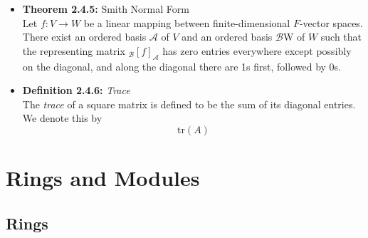 \documentclass[11pt,a4paper]{article}
\begin{document}
\begin{itemize}
    \item \textbf{Theorem 2.4.5:} Smith Normal Form \\
        Let $f : V \to W$ be a linear mapping between finite-dimensional $F$-vector spaces.
        There exist an ordered basis $\mathcal{A}$ of $V$ and an ordered basis
        $\mathcal{B}$W of $W$
        such that the representing matrix $_\mathcal{B}{[f]}_\mathcal{A}$
        has zero entries everywhere except possibly on the diagonal,
        and along the diagonal there are 1s first, followed by 0s.

    \item \textbf{Definition 2.4.6:} \emph{Trace} \\
        The \emph{trace} of a square matrix is defined to be the sum of its diagonal entries.
        We denote this by
        \[
            \mathrm{tr}(A)
        \]
\end{itemize}

\section{Rings and Modules}

\subsection{Rings}
\end{document}
